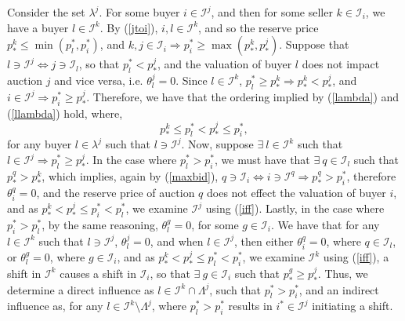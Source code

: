 \documentclass[sigconf, anonymous]{acmart}
\newcommand{\mcI}{\mathcal{I}}
\theoremstyle{definition}
\begin{document}
Consider the set $\lambda^j$. For some buyer $i\in\mcI^j$, and then for
some seller $k \in \mcI_i$, we have a buyer $l \in \mcI^k$. By (\ref{jtoi}), $i,l \in \mcI^k$, and so the reserve price $p_*^k \le \min(p_l^*,
p_i^*)$, and $k, j\in \mcI_i\Rightarrow p_i^* \ge \max(p_*^k, p_*^j)$.
Suppose that $l \ni \mcI^j\Leftrightarrow j \ni \mcI_l$, so
that $p_l^* < p_*^j$, and
the valuation of buyer $l$ does not impact auction $j$ and vice versa, i.e. $\theta_l^j = 0$. Since $l\in\mcI^k$, $p_l^* \ge p_*^k\Rightarrow
p_*^k < p_*^j$, and $i\in\mcI^j \Rightarrow p_i^* \ge p_*^j$. Therefore, we
have that the ordering implied by (\ref{lambda}) and (\ref{llambda}) hold,
where,
\begin{equation}\label{ordering}
    p_*^k \le p_l^* < p_*^j \le p_i^*,
\end{equation} 
for any buyer $l\in\lambda^j$ such that $l\ni \mcI^j$. Now, suppose $\exists \ l\in\mcI^k$ such that $l\in\mcI^j \Rightarrow p_l^* \ge
p_*^j$. In the case where $p_l^* > p_i^*$, we must have that 
$\exists \ q \in \mcI_l$ such that $p_*^q > p_*^k$, %
which implies, again by (\ref{maxbid}), $q\ni\mcI_i \Leftrightarrow i
\ni\mcI^q \Rightarrow p_*^q >
p_i^*$, therefore $\theta_i^q = 0$, and the reserve price of auction $q$ does not effect the valuation of
buyer $i$, and as $p_*^k < p_*^j \le p_i^* < p_l^*$, we examine $\mcI^j$ using
(\ref{iff}).
Lastly, in the case where $p_i^* > p_l^*$, by the same reasoning, $\theta_l^g =
0$, for some $g\in\mcI_i$.
We have that for any $l\in\mcI^k$ such that $l\ni
\mcI^j$, $\theta_l^j =0$, and when $l\in \mcI^j$, then either $\theta_i^q =0$,
where $q\in\mcI_l$, or $\theta_l^g = 0$, where $g\in\mcI_i$, and as $p_*^k <
p_*^j \le p_l^* < p_i^*$, we examine $\mcI^k$ using (\ref{iff}),
a shift in $\mcI^k$ causes a shift in $\mcI_i$, so that $\exists \ g\in\mcI_i$
such that $p_*^g \ge p_*^j$. Thus, we
determine a direct influence as $l\in\mcI^k
\cap \Lambda^j$, such that $p_l^* > p_i^*$,
and an indirect influence as, for any $l\in\mcI^k
\setminus \Lambda^j$, where $p_l^* > p_i^*$ results in $i^*\in\mcI^j$ initiating a shift.
\end{document}
